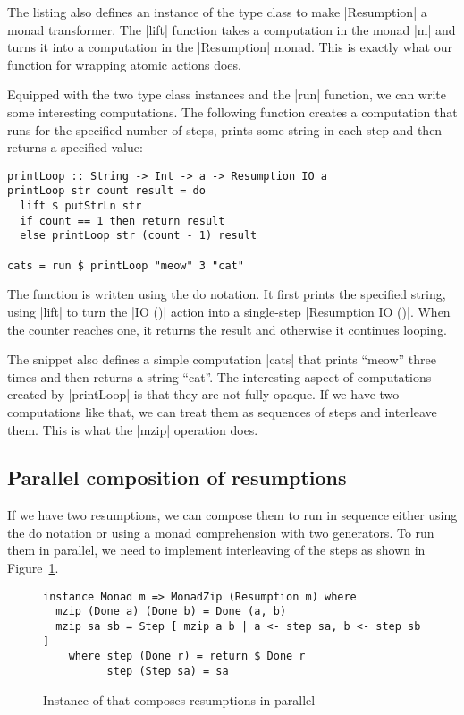 \documentclass{tmr}
\begin{document}
The listing also defines an instance of the  type class to make
|Resumption| a monad transformer. The |lift| function takes a computation in the monad |m| and turns
it into a computation in the |Resumption| monad. This is exactly what our function for wrapping 
atomic actions does.

Equipped with the two type class instances and the |run| function, we can write some interesting
computations. The following function creates a computation that runs for the specified number of
steps, prints some string in each step and then returns a specified value:

\begin{verbatim}
printLoop :: String -> Int -> a -> Resumption IO a
printLoop str count result = do
  lift $ putStrLn str
  if count == 1 then return result
  else printLoop str (count - 1) result

cats = run $ printLoop "meow" 3 "cat"
\end{verbatim}

The function is written using the do notation. It first prints the specified string, using 
|lift| to turn the |IO ()| action into a single-step |Resumption IO ()|. When the counter reaches
one, it returns the result and otherwise it continues looping.

The snippet also defines a simple computation |cats| that prints ``meow'' three times and then 
returns a string ``cat''. The interesting aspect of computations created by |printLoop| is that 
they are not fully opaque. If we have two computations like that, we can treat them as sequences
of steps and interleave them. This is what the |mzip| operation does.


\subsection{Parallel composition of resumptions}

If we have two resumptions, we can compose them to run in sequence either using the do notation or
using a monad comprehension with two generators. To run them in parallel, we need to implement
interleaving of the steps as shown in Figure~\ref{fig:poorman-zip}. 

\begin{figure}
\begin{verbatim}
instance Monad m => MonadZip (Resumption m) where
  mzip (Done a) (Done b) = Done (a, b)
  mzip sa sb = Step [ mzip a b | a <- step sa, b <- step sb ]
    where step (Done r) = return $ Done r 
          step (Step sa) = sa
\end{verbatim}
\caption{Instance of  that composes resumptions in parallel}
\label{fig:poorman-zip}
\end{figure}
\end{document}
